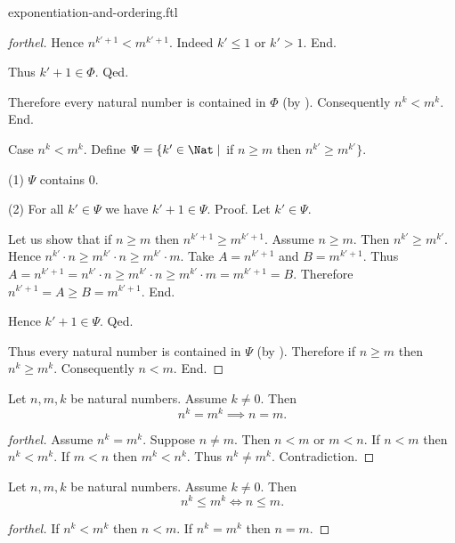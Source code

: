 \documentclass{naproche-library}
\begin{document}
\begin{smodule}[title=Exponentiation and Ordering]{exponentiation-and-ordering.ftl}
\begin{proof}[forthel]
        Hence $n^{k' + 1} < m^{k' + 1}$.
        Indeed $k' \leq 1$ or $k' > 1$.
      End.

      Thus $k' + 1 \in \Phi$.
    Qed.

    Therefore every natural number is contained in $\Phi$ (by ).
    Consequently $n^{k} < m^{k}$.
  End.

  Case $n^{k} < m^{k}$.
    Define $\Psi = \{ k' \in \Nat \mid$ if $n \geq m$ then $n^{k'} \geq m^{k'} \}$.

    (1) $\Psi$ contains $0$.

    (2) For all $k' \in \Psi$ we have $k' + 1 \in \Psi$. \newline
    Proof.
      Let $k' \in \Psi$.

      Let us show that if $n \geq m$ then $n^{k' + 1} \geq m^{k' + 1}$.
        Assume $n \geq m$.
        Then $n^{k'} \geq m^{k'}$.
        Hence $n^{k'} \cdot n \geq m^{k'} \cdot n \geq m^{k'} \cdot m$.
        Take $A = n^{k' + 1}$ and $B = m^{k' + 1}$. %
        Thus $A
          = n^{k' + 1}
          = n^{k'} \cdot n
          \geq m^{k'} \cdot n
          \geq m^{k'} \cdot m
          = m^{k' + 1}
          = B$.
        Therefore $n^{k' + 1} = A \geq B = m^{k' + 1}$.
      End.

      Hence $k' + 1 \in \Psi$.
    Qed.

    Thus every natural number is contained in $\Psi$ (by ).
    Therefore if $n \geq m$ then $n^{k} \geq m^{k}$.
    Consequently $n < m$.
  End.
\end{proof}

\begin{corollary}[forthel,id=ARITHMETIC_09_2797602550579200]
  Let $n, m, k$ be natural numbers.
  Assume $k \neq 0$.
  Then \[ n^{k} = m^{k} \implies n = m. \]
\end{corollary}
\begin{proof}[forthel]
  Assume $n^{k} = m^{k}$.
  Suppose $n \neq m$.
  Then $n < m$ or $m < n$.
  If $n < m$ then $n^{k} < m^{k}$.
  If $m < n$ then $m^{k} < n^{k}$.
  Thus $n^{k} \neq m^{k}$.
  Contradiction.
\end{proof}

\begin{corollary}[forthel,id=ARITHMETIC_09_6875081963732992]
  Let $n, m, k$ be natural numbers.
  Assume $k \neq 0$.
  Then \[ n^{k} \leq m^{k} \iff n \leq m. \]
\end{corollary}
\begin{proof}[forthel]
  If $n^{k} < m^{k}$ then $n < m$.
  If $n^{k} = m^{k}$ then $n = m$.


\end{proof}
\end{smodule}
\end{document}

